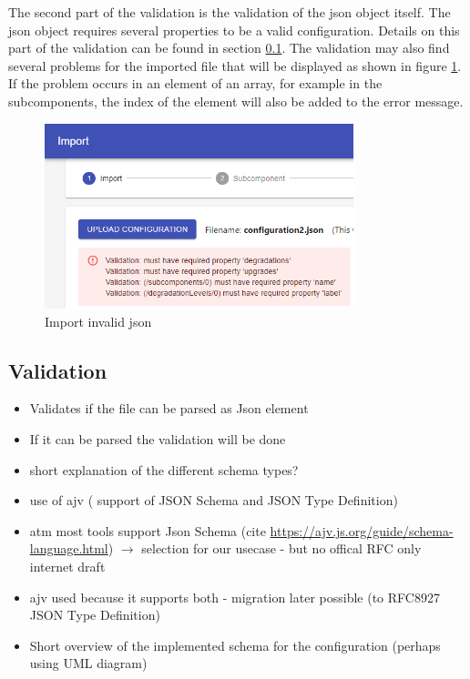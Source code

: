 \noindent The second part of the validation is the validation of the json object itself. The json object requires several properties to be a valid configuration. Details on this part of the validation can be found in section \ref{sec:validation}.
The validation may also find several problems for the imported file that will be displayed as shown in figure \ref{fig:import_invalid_json}. If the problem occurs in an element of an array, for example in the subcomponents, the index of the element will also be added to the error message.

\begin{figure}[ht]
    \centering
    \includegraphics[width=0.8\textwidth]{img/import_invalid_json.png}
    \caption{Import invalid json}
    \label{fig:import_invalid_json}
\end{figure}

\subsection{Validation}
\label{sec:validation}
\begin{itemize}
    \item Validates if the file can be parsed as Json element
    \item If it can be parsed the validation will be done
    \item short explanation of the different schema types?
    \item use of ajv ( support of JSON Schema and JSON Type Definition)
    \item atm most tools support Json Schema (cite \url{https://ajv.js.org/guide/schema-language.html})  $\rightarrow$ selection for our usecase - but no offical RFC only internet draft
    \item ajv used because it supports both - migration later possible (to RFC8927 JSON Type Definition)
    \item Short overview of the implemented schema for the configuration (perhaps using UML diagram)
\end{itemize}

